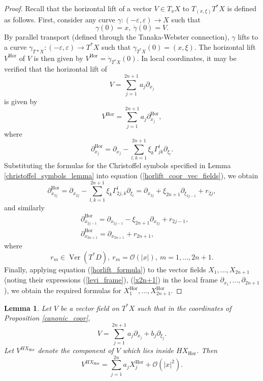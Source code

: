\documentclass{article}
\newtheorem{lemma}[theorem]{Lemma}
\newcommand{\mco}{\mathcal O}
\DeclareMathOperator{\Hor}{Hor}
\DeclareMathOperator{\Ver}{Ver}
\begin{document}
\begin{proof}
%
Recall that the horizontal lift of a vector $V\in T_x X$ to $T_{(x,\xi)} T^*X$ is defined as follows. First, consider any curve $\gamma : (-\varepsilon, \varepsilon) \to X$ such that $$\gamma(0) = x,\ \dot \gamma(0) = V.$$ By parallel transport (defined through the Tanaka-Webster connection), $\gamma$ lifts to a curve $\gamma_{T*X} : (-\varepsilon, \varepsilon) \to T^*X$ such that $\gamma_{T^*X}(0) = (x, \xi)$. The horizontal lift $V^{\Hor}$ of $V$ is then given by $V^{\Hor} = \dot \gamma_{T^*X}(0)$.
%
In local coordinates, it may be verified that the horizontal lift of $$V = \sum_{j=1}^{2n+1} a_j \partial_{x_j}$$ is given by \begin{equation}\label{horlift_formula} V^{\Hor} = \sum_{j=1}^{2n+1} a_j \partial_{x_j}^{\Hor},\end{equation}
where \begin{equation}\label{horlift_coor_vec_fields}\partial_{x_j}^{\Hor} = \partial_{x_j} - \sum_{l,k = 1}^{2n+1} \xi_k \Gamma^l_{jk} \partial_{\xi_l}.\end{equation}
Substituting the formulas for the Christoffel symbols specified in Lemma \ref{christoffel_symbols_lemma} into equation (\ref{horlift_coor_vec_fields}), we obtain $$\partial_{x_{2j}}^{\Hor} = \partial_{x_{2j}} - \sum_{l,k = 1}^{2n+1} \xi_k \Gamma^l_{2j, k} \partial_{\xi_l} = \partial_{x_{2j}} + \xi_{2n+1} \partial_{\xi_{2j-1}} + r_{2j},$$
and similarly $$\begin{aligned} &\partial_{x_{2j-1}}^{\Hor} = \partial_{x_{2j-1}} - \xi_{2n+1} \partial_{x_{2j}} + r_{2j-1},\\ &\partial_{x_{2n+1}}^{\Hor} = \partial_{x_{2n+1}} + r_{2n+1},\end{aligned}$$
where $$r_m \in \Ver(T^*D),\ r_m = \mco(|x|),\ m = 1,...,2n+1.$$
Finally, applying equation (\ref{horlift_formula}) to the vector fields $X_1,...,X_{2n+1}$ (noting their expressions (\ref{levi_frame}), (\ref{x2n+1}) in the local frame $\partial_{x_1},...,\partial_{2n+1}$), we obtain the required formulas for $X_1^{\Hor},...,X_{2n+1}^{\Hor}$.
\end{proof}
%
\begin{lemma}\label{hor_levi_comp} Let $V$ be a vector field on $T^*X$ such that in the coordinates of Proposition \ref{canonic_coor},$$V = \sum_{j=1}^{2n+1} a_j \partial_{x_j} + b_j \partial_{\xi_j}.$$
Let $V^{HX_{\Hor}}$ denote the component of $V$ which lies inside $HX_{\Hor}$. Then $$V^{H X_{\Hor}} = \sum_{j=1}^{2n} a_j X_j^{\Hor} + \mco(|x|^2).$$\end{lemma}
\end{document}
